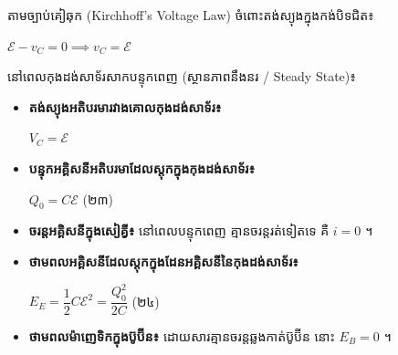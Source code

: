 \vspace{0.6em}
\noindent
តាមច្បាប់គៀឆុក ({\englishfont Kirchhoff's Voltage Law}) ចំពោះតង់ស្យុងក្នុងកង់បិទជិត៖
\begin{center}
	$\mathcal{E} - v_C = 0 \implies v_C = \mathcal{E}$
\end{center}

\noindent
នៅពេលកុងដង់សាទ័រសាកបន្ទុកពេញ (ស្ថានភាពនឹងនរ / {\englishfont Steady State})៖
\begin{itemize}[itemsep=4pt, topsep=2pt, parsep=0pt, leftmargin=1.6em]
	\item \textbf{តង់ស្យុងអតិបរមារវាងគោលកុងដង់សាទ័រ៖}
	\begin{center}
		$V_C = \mathcal{E}$
	\end{center}
	\item \textbf{បន្ទុកអគ្គិសនីអតិបរមាដែលស្តុកក្នុងកុងដង់សាទ័រ៖}
	\begin{center}
		$\boxed{Q_0 = C\mathcal{E}}$ \quad (២៣)
	\end{center}
	\item \textbf{ចរន្តអគ្គិសនីក្នុងសៀគ្វី៖} នៅពេលបន្ទុកពេញ គ្មានចរន្តរត់ទៀតទេ គឺ $i = 0$ ។
	\item \textbf{ថាមពលអគ្គិសនីដែលស្តុកក្នុងដែនអគ្គិសនីនៃកុងដង់សាទ័រ៖}
	\begin{center}
		$\boxed{E_E = \dfrac{1}{2}C\mathcal{E}^2 = \dfrac{Q_0^2}{2C}}$ \quad (២៤)
	\end{center}
	\item \textbf{ថាមពលម៉ាញេទិកក្នុងប៊ូប៊ីន៖} ដោយសារគ្មានចរន្តឆ្លងកាត់ប៊ូប៊ីន នោះ $E_B = 0$ ។
\end{itemize}

\vspace{0.4em}



